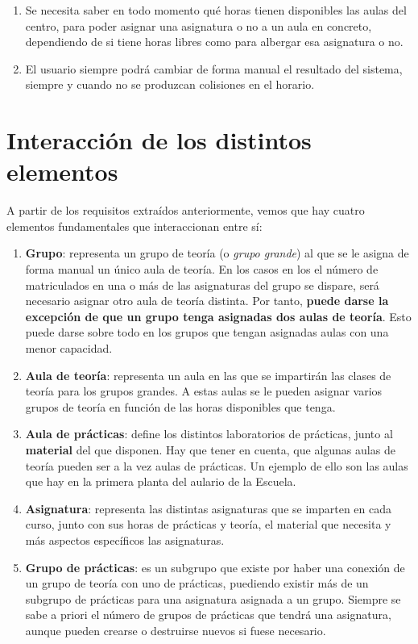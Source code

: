 \begin{enumerate}[REQ-1]
    \item Se necesita saber en todo momento qué horas tienen disponibles las aulas del centro, para poder asignar una asignatura o no a un aula en concreto, dependiendo de si tiene horas libres como para albergar esa asignatura o no.
    \item El usuario siempre podrá cambiar de forma manual el resultado del sistema, siempre y cuando no se produzcan colisiones en el horario.
\end{enumerate}

\section{Interacción de los distintos elementos}

A partir de los requisitos extraídos anteriormente, vemos que hay cuatro elementos fundamentales que interaccionan entre sí:

\begin{enumerate}[---]
    \item \textbf{Grupo}: representa un grupo de teoría (o \textit{grupo grande}) al que se le asigna de forma manual un único aula de teoría. En los casos en los el número de matriculados en una o más de las asignaturas del grupo se dispare, será necesario asignar otro aula de teoría distinta. Por tanto, \textbf{puede darse la excepción de que un grupo tenga asignadas dos aulas de teoría}. Esto puede darse sobre todo en los grupos que tengan asignadas aulas con una menor capacidad. 
    \item \textbf{Aula de teoría}: representa un aula en las que se impartirán las clases de teoría para los grupos grandes. A estas aulas se le pueden asignar varios grupos de teoría en función de las horas disponibles que tenga.
    \item \textbf{Aula de prácticas}: define los distintos laboratorios de prácticas, junto al \textbf{material} del que disponen. Hay que tener en cuenta, que algunas aulas de teoría pueden ser a la vez aulas de prácticas. Un ejemplo de ello son las aulas que hay en la primera planta del aulario de la Escuela.
    \item \textbf{Asignatura}: representa las distintas asignaturas que se imparten en cada curso, junto con sus horas de prácticas y teoría, el material que necesita y más aspectos específicos las asignaturas.
    \item \textbf{Grupo de prácticas}: es un subgrupo que existe por haber una conexión de un grupo de teoría con uno de prácticas, puediendo existir más de un subgrupo de prácticas para una asignatura asignada a un grupo. Siempre se sabe a priori el número de grupos de prácticas que tendrá una asignatura, aunque pueden crearse o destruirse nuevos si fuese necesario.
\end{enumerate}

